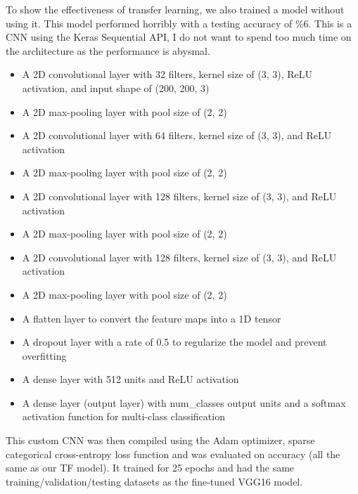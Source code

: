 \documentclass[12pt]{article}
\begin{document}
To show the effectiveness of 
transfer learning, we also trained a model without using it. This model performed horribly with a testing accuracy of \%6. This is a CNN using the Keras Sequential API, I do not want to spend too much time on the 
architecture as the performance is abysmal.
\begin{itemize}
    \item A 2D convolutional layer with 32 filters, kernel size of (3, 3), ReLU activation, and input shape of (200, 200, 3)
    \item A 2D max-pooling layer with pool size of (2, 2)
    \item A 2D convolutional layer with 64 filters, kernel size of (3, 3), and ReLU activation
    \item A 2D max-pooling layer with pool size of (2, 2)
    \item A 2D convolutional layer with 128 filters, kernel size of (3, 3), and ReLU activation
    \item A 2D max-pooling layer with pool size of (2, 2)
    \item A 2D convolutional layer with 128 filters, kernel size of (3, 3), and ReLU activation
    \item A 2D max-pooling layer with pool size of (2, 2)
    \item A flatten layer to convert the feature maps into a 1D tensor
    \item A dropout layer with a rate of 0.5 to regularize the model and prevent overfitting
    \item A dense layer with 512 units and ReLU activation
    \item A dense layer (output layer) with num\_classes output units and a softmax activation function for multi-class classification
\end{itemize} 
This custom CNN was then compiled using the Adam optimizer, sparse categorical cross-entropy loss function and was evaluated on accuracy (all the same as our TF model).
It trained for 25 epochs and had the same training/validation/testing datasets as the fine-tuned VGG16 model.\\
\end{document}
